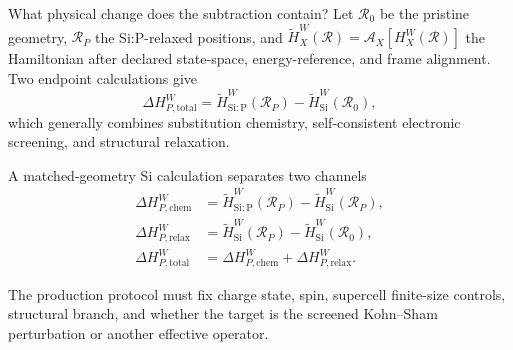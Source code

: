 \documentclass[aspectratio=169,10pt]{beamer}
\newcommand{\future}[1]{\textcolor{prospectivered}{#1}}
\begin{document}
\begin{frame}{What physical change does the subtraction contain?}
  \small
  Let $\mathcal R_0$ be the pristine geometry, $\mathcal R_P$ the Si:P-relaxed
  positions, and $\widetilde H_X^W(\mathcal R)=\mathcal A_X[H_X^W(\mathcal R)]$ the
  Hamiltonian after declared state-space, energy-reference, and frame alignment.
  Two endpoint calculations give
  \[
    \Delta H_{P,\mathrm{total}}^W
      =\widetilde H_{\mathrm{Si:P}}^W(\mathcal R_P)
       -\widetilde H_{\mathrm{Si}}^W(\mathcal R_0),
  \]
  which generally combines substitution chemistry, self-consistent electronic
  screening, and structural relaxation.

  \begin{block}{A matched-geometry Si calculation separates two channels}
    \begin{align*}
      \Delta H_{P,\mathrm{chem}}^W
        &=\widetilde H_{\mathrm{Si:P}}^W(\mathcal R_P)
          -\widetilde H_{\mathrm{Si}}^W(\mathcal R_P),\\
      \Delta H_{P,\mathrm{relax}}^W
        &=\widetilde H_{\mathrm{Si}}^W(\mathcal R_P)
          -\widetilde H_{\mathrm{Si}}^W(\mathcal R_0),\\
      \Delta H_{P,\mathrm{total}}^W
        &=\Delta H_{P,\mathrm{chem}}^W+\Delta H_{P,\mathrm{relax}}^W.
    \end{align*}
  \end{block}

  \future{The production protocol must fix charge state, spin, supercell finite-size
  controls, structural branch, and whether the target is the screened Kohn--Sham
  perturbation or another effective operator.}
\end{frame}
\end{document}
